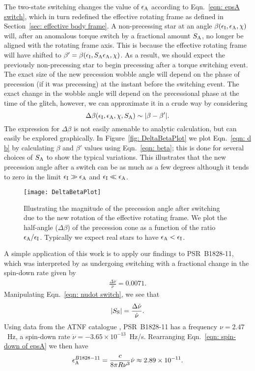 \documentclass[../full_thesis/full_thesis.tex]{subfiles}
\begin{document}
The two-state switching changes the value of $\epsilon_{\mathrm{A}}$ according to
Eqn.~\eqref{eqn: epsA switch}, which in turn redefined the effective rotating frame
as defined in Section~\ref{sec: effective body frame}. A non-precessing star at an
angle $\beta(\epsilon_{\mathrm{I}}, \epsilon_{\mathrm{A}}, \chi)$ will, after an anomalous torque switch by a fractional
amount $S_{\mathrm{A}}$, no longer be aligned with the rotating frame axis. This is
because the effective rotating frame will have shifted to $\beta' = \beta(\epsilon_{\mathrm{I}},
S_{\mathrm{A}}\epsilon_{\mathrm{A}}, \chi)$. As a result, we should expect the previously
non-precessing star to begin precessing after a torque switching event.
The exact size of the new precession wobble angle will depend on the phase of
precession (if it was precessing) at the instant before the switching event.
The exact change in the wobble angle will depend on the precessional phase at
the time of the glitch, however, we can approximate it in a crude way by considering
\begin{equation}
    \Delta\beta(\epsilon_{\mathrm{I}}, \epsilon_{\mathrm{A}}, \chi, S_{\mathrm{A}}) \sim |\beta - \beta'|.
\label{eqn: d b}
\end{equation}
The expression for $\Delta \beta$ is not easily amenable to analytic
calculation, but can easily be explored graphically. In Figure~\ref{fig:
DeltaBetaPlot} we plot Eqn.~\eqref{eqn: d b} by calculating $\beta$ and
$\beta'$ values using Eqn.~\eqref{eqn: beta}; this is done for several choices
of $S_{\mathrm{A}}$ to show the typical variations. This illustrates that the new
precession angle after a switch can be as much as a few degrees although it
tends to zero in the limit $\epsilon_{\mathrm{I}} \gg \epsilon_{\mathrm{A}}$ and $\epsilon_{\mathrm{I}} \ll \epsilon_{\mathrm{A}}$.
\begin{figure}[htb]
    \centering
    \texttt{[image: DeltaBetaPlot]}
    \caption{Illustrating the magnitude of the precession angle after switching
        due to the new rotation of the effective rotating frame. We plot the half-angle
        ($\Delta\beta$) of the precession cone as a function of the ratio
    $\epsilon_{\mathrm{A}}/\epsilon_{\mathrm{I}}$. Typically we expect real stars to have $\epsilon_{\mathrm{A}} < \epsilon_{\mathrm{I}}$.}
    \label{fig: DeltaBetaPlot}
\end{figure}

A simple application of this work is to apply our findings to PSR~B1828-11,
which was interpreted by \citet{Lyne2010} as undergoing switching with a fractional
change in the spin-down rate given by
\begin{align}
\frac{\Delta\dot{\nu}}{\dot{\nu}} = 0.0071.
\end{align}
Manipulating Eqn.~\eqref{eqn: nudot switch}, we see that
\begin{align}
|S_{\mathrm{S}}| = \frac{\Delta\dot{\nu}}{\dot{\nu}}.
\end{align}
Using data from the ATNF catalogue \citep{ATNF}, PSR~B1828-11 has a frequency
$\nu = 2.47$~Hz, a spin-down rate $\dot{\nu}=-3.65\times10^{-13}$~Hz/s.
Rearranging Eqn.~\eqref{eqn: spin-down of epsA} we then have
\begin{align}
\epsilon_{\mathrm{A}}^{B1828-11} = \frac{c}{8\pi R\nu^{3}}\dot{\nu} \approx 2.89 \times 10^{-11}.
\end{align}
\end{document}

